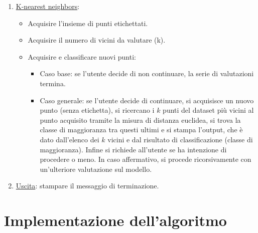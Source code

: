 \documentclass[11pt]{article}
\theoremstyle{definition}
\begin{document}
\begin{itemize}
\begin{enumerate}
     \item \underline{K-nearest neighbors}: 
       \begin{itemize}
         \item Acquisire l'insieme di punti etichettati.
         \item Acquisire il numero di vicini da valutare (k).
         \item Acquisire e classificare nuovi punti:
         \begin{itemize}
           \item Caso base: se l'utente decide di non continuare, la serie di valutazioni termina.
           \item Caso generale: se l'utente decide di continuare, si acquisisce un nuovo punto (senza etichetta), si ricercano i $k$ punti del dataset più vicini al punto acquisito tramite la misura di distanza euclidea, si trova la classe di maggioranza tra questi ultimi e si stampa l'output, che è dato dall'elenco dei $k$ vicini e dal risultato di classificazione (classe di maggioranza). Infine si richiede all'utente se ha intenzione di procedere o meno. In caso affermativo, si procede ricorsivamente con un'ulteriore valutazione sul modello.
         \end{itemize}
       \end{itemize}
      \item \underline{Uscita}: stampare il messaggio di terminazione.
\end{enumerate}
\end{itemize}

\newpage

\section{Implementazione dell'algoritmo}
\end{document}

